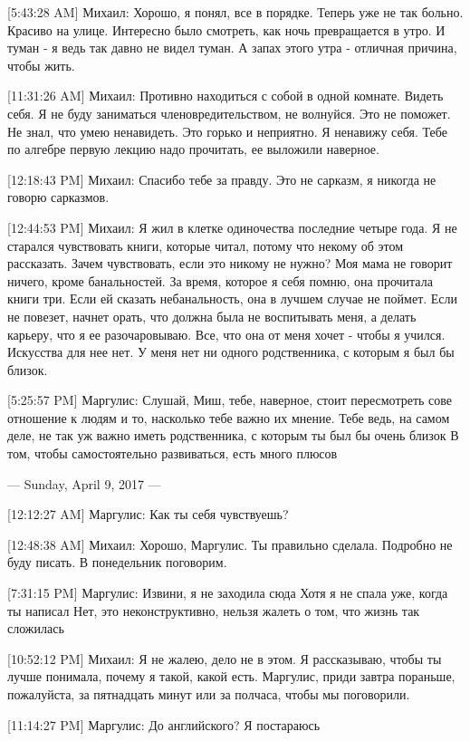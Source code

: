 \documentclass{article}
\begin{document}
[5:43:28 AM] Михаил:
Хорошо, я понял, все в порядке.
 Теперь уже не так больно.
 Красиво на улице. Интересно было смотреть, как ночь превращается в утро. И туман - я ведь так давно не видел туман.
 А запах этого утра - отличная причина, чтобы жить.

[11:31:26 AM] Михаил:
Противно находиться с собой в одной комнате.
 Видеть себя.
 Я не буду заниматься членовредительством, не волнуйся. Это не поможет.
 Не знал, что умею ненавидеть. Это горько и неприятно. Я ненавижу себя.
 Тебе по алгебре первую лекцию надо прочитать, ее выложили наверное.

[12:18:43 PM] Михаил:
Спасибо тебе за правду. Это не сарказм, я никогда не говорю сарказмов.

[12:44:53 PM] Михаил:
Я жил в клетке одиночества последние четыре года. Я не старался чувствовать книги, которые читал, потому что некому об этом рассказать. Зачем чувствовать, если это никому не нужно?
Моя мама не говорит ничего, кроме банальностей. За время, которое я себя помню, она прочитала книги три. Если ей сказать небанальность, она в лучшем случае не поймет. Если не повезет, начнет орать, что должна была не воспитывать меня, а делать карьеру, что я ее разочаровываю.
 Все, что она от меня хочет - чтобы я учился. Искусства для нее нет.
 У меня нет ни одного родственника, с которым я был бы близок.

[5:25:57 PM] Маргулис:
Слушай, Миш, тебе, наверное, стоит пересмотреть сове отношение к людям и то, насколько тебе важно их мнение.
 Тебе ведь, на самом деле, не так уж важно иметь родственника, с которым ты был бы очень близок
 В том, чтобы самостоятельно развиваться, есть много плюсов

--- Sunday, April 9, 2017 ---

[12:12:27 AM] Маргулис:
Как ты себя чувствуешь?

[12:48:38 AM] Михаил:
Хорошо, Маргулис. Ты правильно сделала. Подробно не буду писать. В понедельник поговорим.

[7:31:15 PM] Маргулис:
Извини, я не заходила сюда
 Хотя я не спала уже, когда ты написал
 Нет, это неконструктивно, нельзя жалеть о том, что жизнь так сложилась

[10:52:12 PM] Михаил:
Я не жалею, дело не в этом. Я рассказываю, чтобы ты лучше понимала, почему я такой, какой есть. Маргулис, приди завтра пораньше, пожалуйста, за пятнадцать минут или за полчаса, чтобы мы поговорили.

[11:14:27 PM] Маргулис:
До английского? Я постараюсь
\end{document}
